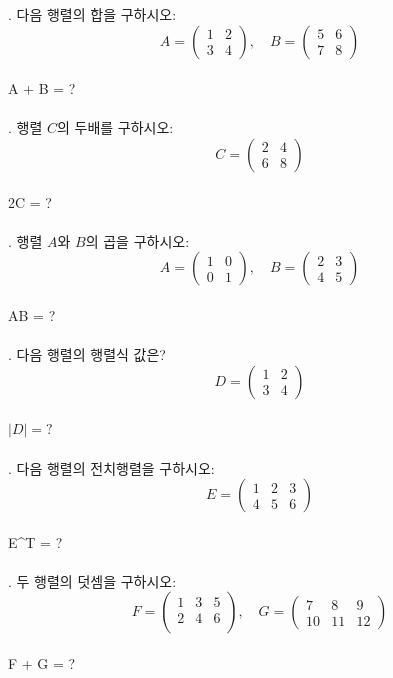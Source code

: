 \documentclass[fleqn]{article}
\begin{document}
      
. 다음 행렬의 합을 구하시오:  
\[
A = \begin{pmatrix}
1 & 2 \\
3 & 4
\end{pmatrix}, \quad 
B = \begin{pmatrix}
5 & 6 \\
7 & 8
\end{pmatrix}
\]  
\\
A + B = ? \\\\

. 행렬 \( C \)의 두배를 구하시오:  
\[
C = \begin{pmatrix}
2 & 4 \\
6 & 8
\end{pmatrix}
\]  
\\
2C = ? \\\\

. 행렬 \( A \)와 \( B \)의 곱을 구하시오:  
\[
A = \begin{pmatrix}
1 & 0 \\
0 & 1
\end{pmatrix}, \quad 
B = \begin{pmatrix}
2 & 3 \\
4 & 5
\end{pmatrix}
\]  
\\
AB = ? \\\\

. 다음 행렬의 행렬식 값은?  
\[
D = \begin{pmatrix}
1 & 2 \\
3 & 4
\end{pmatrix}
\]  
\\
\(|D| = ?\) \\\\

. 다음 행렬의 전치행렬을 구하시오:  
\[
E = \begin{pmatrix}
1 & 2 & 3 \\
4 & 5 & 6
\end{pmatrix}
\]  
\\
E^T = ? \\\\

. 두 행렬의 덧셈을 구하시오:  
\[
F = \begin{pmatrix}
1 & 3 & 5 \\
2 & 4 & 6 \\
\end{pmatrix}, \quad 
G = \begin{pmatrix}
7 & 8 & 9 \\
10 & 11 & 12 
\end{pmatrix}
\]  
\\
F + G = ? \\\\
\end{document}
